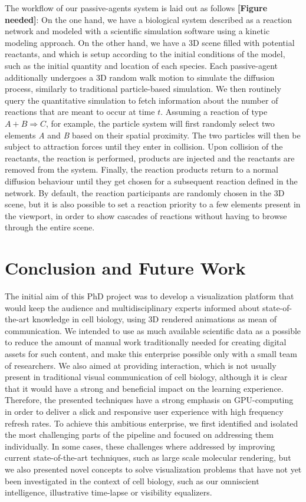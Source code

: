 The workflow of our passive-agents system is laid out as follows \textbf{[Figure needed]}:
On the one hand, we have a biological system described as a reaction network and modeled with a scientific simulation software using a kinetic modeling approach.
On the other hand, we have a 3D scene filled with potential reactants, and which is setup according to the initial conditions of the model, such as the initial quantity and location of each species.
Each passive-agent additionally undergoes a 3D random walk motion to simulate the diffusion process, similarly to traditional particle-based simulation.
We then routinely query the quantitative simulation to fetch information about the number of reactions that are meant to occur at time $t$.
Assuming a reaction of type $A + B \Rightarrow C$, for example, the particle system will first randomly select two elements \textit{A} and \textit{B} based on their spatial proximity.
The two particles will then be subject to attraction forces until they enter in collision.
Upon collision of the reactants, the reaction is performed, products are injected and the reactants are removed from the system.
Finally, the reaction products return to a normal diffusion behaviour until they get chosen for a subsequent reaction defined in the network.
By default, the reaction participants are randomly chosen in the 3D scene, but it is also possible to set a reaction priority to a few elements present in the viewport, in order to show cascades of reactions without having to browse through the entire scene.

\section{Conclusion and Future Work}
\label{sec:section5}

The initial aim of this PhD project was to develop a visualization platform that would keep the audience and multidisciplinary experts informed about state-of-the-art knowledge in cell biology, using 3D rendered animations as mean of communication.
We intended to use as much available scientific data as a possible to reduce the amount of manual work traditionally needed for creating digital assets for such content, and make this enterprise possible only with a small team of researchers.
We also aimed at providing interaction, which is not usually present in traditional visual communication of cell biology, although it is clear that it would have a strong and beneficial impact on the learning experience.
Therefore, the presented techniques have a strong emphasis on GPU-computing in order to deliver a slick and responsive user experience with high frequency refresh rates. 
To achieve this ambitious enterprise, we first identified and isolated the most challenging parts of the pipeline and focused on addressing them individually.
In some cases, these challenges where addressed by improving current state-of-the-art techniques, such as large scale molecular rendering, but we also presented novel concepts to solve visualization problems that have not yet been investigated in the context of cell biology, such as our omniscient intelligence, illustrative time-lapse or visibility equalizers.  

